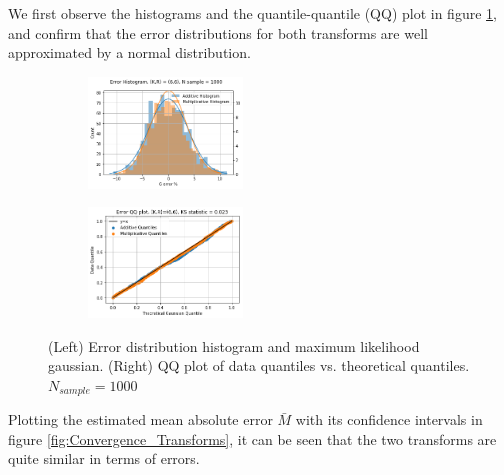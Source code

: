 We first observe the histograms and the quantile-quantile (QQ) plot in figure \ref{fig:ErrorHistAndQQPlot}, and confirm that the error distributions for both transforms are well approximated by a normal distribution.
\begin{figure}[!htb]
\begin{center}
\begin{subfigure}
    \centering
    \includegraphics[width=0.45\textwidth]{Chap6_EvaluationAndAnalysis/transform_variation/hist_KR6_transforms.png}
\end{subfigure}
\begin{subfigure}
    \centering
    \includegraphics[width=0.45\textwidth]{Chap6_EvaluationAndAnalysis/transform_variation/QQ_KR6_transforms.png}
\end{subfigure}
\caption{(Left) Error distribution histogram and maximum likelihood gaussian. (Right) QQ plot of data quantiles vs. theoretical quantiles. \(N_{sample}=1000\)}
\label{fig:ErrorHistAndQQPlot}
\end{center}
\end{figure}

Plotting the estimated mean absolute error \(\bar{M}\) with its confidence intervals in figure \ref{fig:Convergence_Transforms}, it can be seen that the two transforms are quite similar in terms of errors.

